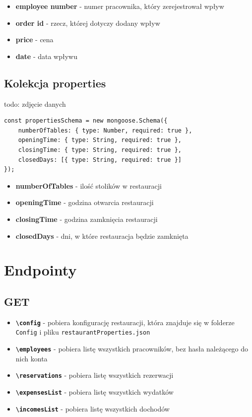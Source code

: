 \documentclass[12pt]{article}
\begin{document}
\begin{itemize}
	\item \textbf{employee number} - numer pracownika, który zerejestrował wpływ
	\item \textbf{order id} - rzecz, której dotyczy dodany wpływ
	\item \textbf{price} - cena
	\item \textbf{date} - data wpływu
\end{itemize}

\newpage
\begin{samepage}
\subsection{Kolekcja properties}
todo: zdjęcie danych
\begin{lstlisting}[caption={Properties}]
const propertiesSchema = new mongoose.Schema({
    numberOfTables: { type: Number, required: true },
    openingTime: { type: String, required: true },
    closingTime: { type: String, required: true },
    closedDays: [{ type: String, required: true }]
});
\end{lstlisting}
\end{samepage}

\begin{itemize}
	\item \textbf{numberOfTables} - ilość stolików w restauracji
	\item \textbf{openingTime} - godzina otwarcia restauracji
	\item \textbf{closingTime} - godzina zamknięcia restauracji
	\item \textbf{closedDays} - dni, w które restauracja będzie zamknięta
\end{itemize}

\newpage
\section{Endpointy}
\subsection{GET}
\begin{itemize}
    \item \textbf{\texttt{\textbackslash config}} - pobiera konfigurację restauracji, która znajduje się w folderze \texttt{Config} i pliku \texttt{restaurantProperties.json}
    \item \textbf{\texttt{\textbackslash employees}} - pobiera listę wszystkich pracowników, bez hasła należącego do nich konta
    \item \textbf{\texttt{\textbackslash reservations}} - pobiera listę wszystkich rezerwacji
    \item \textbf{\texttt{\textbackslash expensesList}} - pobiera listę wszystkich wydatków
    \item \textbf{\texttt{\textbackslash incomesList}} - pobiera listę wszystkich dochodów
\end{itemize}
\end{document}
